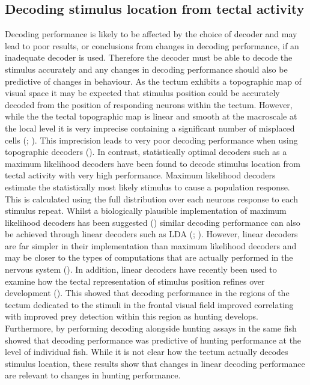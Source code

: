 \subsection{Decoding stimulus location from tectal activity}
Decoding performance is likely to be affected by the choice of decoder and may lead to poor results, or conclusions from changes in decoding performance, if an inadequate decoder is used. Therefore the decoder must be able to decode the stimulus accurately and any changes in decoding performance should also be predictive of changes in behaviour.  As the tectum exhibits a topographic map of visual space it may be expected that stimulus position could be accurately decoded from the position of responding neurons within the tectum. However, while the the tectal topographic map is linear and smooth at the macroscale at the local level it is very imprecise containing a significant number of misplaced cells (\cite{Niell2005FunctionalTectum}; \cite{Romano2017}). This imprecision leads to very poor decoding performance when using topographic decoders (\cite{Avitan2016}). In contrast, statistically optimal decoders such as a maximum likelihood decoders have been found to decode stimulus location from tectal activity with very high performance. Maximum likelihood decoders estimate the statistically most likely stimulus to cause a population response. This is calculated using the full distribution over each neurons response to each stimulus repeat. Whilst a biologically plausible implementation of maximum likelihood decoders has been suggested (\cite{Jazayeri2006OptimalPopulations}) similar decoding performance can also be achieved through linear decoders such as LDA (\cite{Avitan2016}; \cite{Avitan2019}). However, linear decoders are far simpler in their implementation than maximum likelihood decoders and may be closer to the types of computations that are actually performed in the nervous system (\cite{Salinas1994VectorRates}). In addition, linear decoders have recently been used to examine how the tectal representation of stimulus position refines over development (\cite{Avitan2019}). This showed that decoding performance in the regions of the tectum dedicated to the stimuli in the frontal visual field improved correlating with improved prey detection within this region as hunting develops. Furthermore, by performing decoding alongside hunting assays in the same fish showed that decoding performance was predictive of hunting performance at the level of individual fish. While it is not clear how the tectum actually decodes stimulus location, these results show that changes in linear decoding performance are relevant to changes in hunting performance. 

